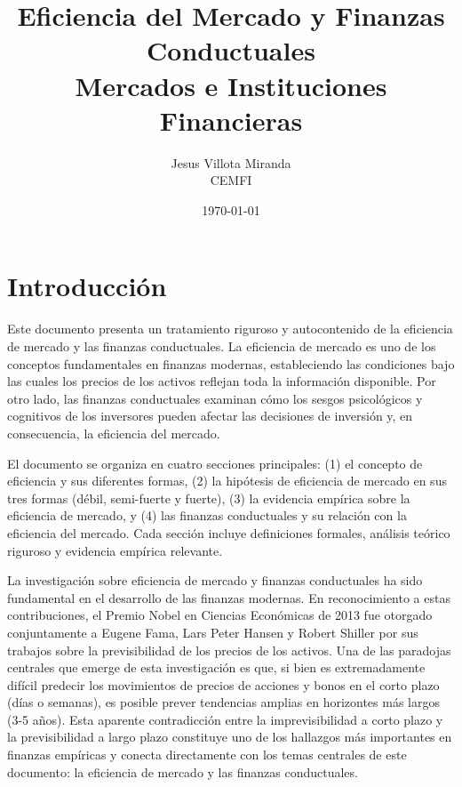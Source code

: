 

\title{\textbf{Eficiencia del Mercado y Finanzas Conductuales}\\
\large Mercados e Instituciones Financieras}
\author{Jesus Villota Miranda\\
CEMFI}
\date{\today}



\maketitle

\tableofcontents
\newpage

\section{Introducción}

Este documento presenta un tratamiento riguroso y autocontenido de la eficiencia de mercado y las finanzas conductuales. La eficiencia de mercado es uno de los conceptos fundamentales en finanzas modernas, estableciendo las condiciones bajo las cuales los precios de los activos reflejan toda la información disponible. Por otro lado, las finanzas conductuales examinan cómo los sesgos psicológicos y cognitivos de los inversores pueden afectar las decisiones de inversión y, en consecuencia, la eficiencia del mercado.

El documento se organiza en cuatro secciones principales: (1) el concepto de eficiencia y sus diferentes formas, (2) la hipótesis de eficiencia de mercado en sus tres formas (débil, semi-fuerte y fuerte), (3) la evidencia empírica sobre la eficiencia de mercado, y (4) las finanzas conductuales y su relación con la eficiencia del mercado. Cada sección incluye definiciones formales, análisis teórico riguroso y evidencia empírica relevante.

La investigación sobre eficiencia de mercado y finanzas conductuales ha sido fundamental en el desarrollo de las finanzas modernas. En reconocimiento a estas contribuciones, el Premio Nobel en Ciencias Económicas de 2013 fue otorgado conjuntamente a Eugene Fama, Lars Peter Hansen y Robert Shiller por sus trabajos sobre la previsibilidad de los precios de los activos. Una de las paradojas centrales que emerge de esta investigación es que, si bien es extremadamente difícil predecir los movimientos de precios de acciones y bonos en el corto plazo (días o semanas), es posible prever tendencias amplias en horizontes más largos (3-5 años). Esta aparente contradicción entre la imprevisibilidad a corto plazo y la previsibilidad a largo plazo constituye uno de los hallazgos más importantes en finanzas empíricas y conecta directamente con los temas centrales de este documento: la eficiencia de mercado y las finanzas conductuales.


